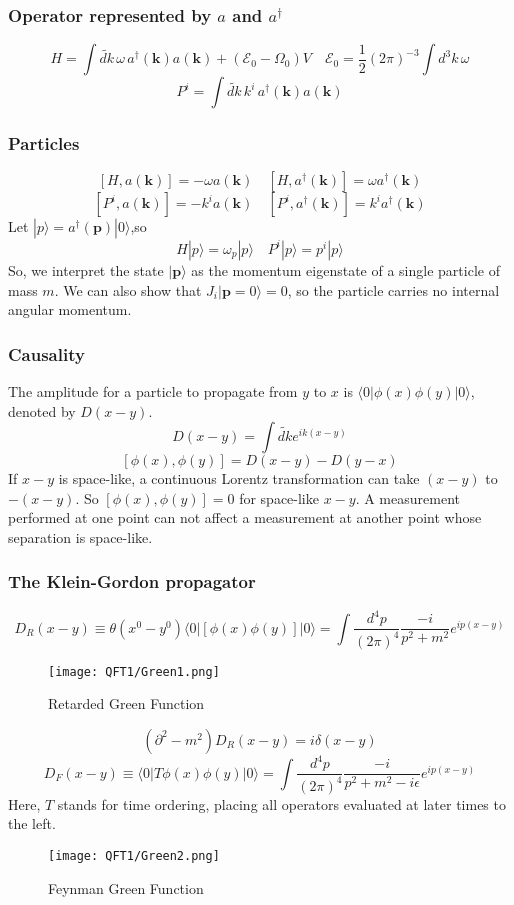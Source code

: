 \subsubsection{Operator represented by $a$ and $a^{\dagger}$}
\[H=\int \widetilde{dk}\, \omega\, a^{\dagger}(\bm{k})a(\bm{k}) + (\mathcal{E}_0 - \Omega_0)V \quad \mathcal{E}_0 = \frac{1}{2}(2\pi)^{-3}\int d^3 k \,\omega\]
\[P^{i}=\int \widetilde{dk}\, k^{i}\, a^{\dagger}(\bm{k})a(\bm{k}) \]
\subsubsection{Particles}
\[[H,a(\bm{k})] = -\omega a(\bm{k}) \quad [H,a^{\dagger}(\bm{k})] = \omega a^{\dagger}(\bm{k})\]
\[[P^i,a(\bm{k})] = -k^i a(\bm{k}) \quad [P^i,a^{\dagger}(\bm{k})] = k^i a^{\dagger}(\bm{k})\]
Let $|p\rangle = a^{\dagger}(\bm{p})|0\rangle $,so
\[H |p\rangle = \omega_p|p\rangle \quad P^i |p\rangle = p^i|p\rangle\]
So, we interpret the state $|\bm{p}\rangle$ as the momentum eigenstate of a single particle of mass $m$. We can also show that 
$J_i|\bm{p} = 0\rangle = 0$, so the particle carries no internal angular momentum.
\subsubsection{Causality}
\noindent
The amplitude for a particle to propagate from $y$ to $x$ is $\langle 0 | \phi(x) \phi(y) | 0 \rangle$, denoted by $D(x-y)$.
\[D(x-y) = \int \widetilde{dk} e^{ik(x-y)}\]
\[[\phi(x),\phi(y)] = D(x-y) -D(y-x)\]
If $x-y$ is space-like, a continuous Lorentz transformation can take $(x-y)$ to $-(x-y)$. So $[\phi(x),\phi(y)] =0$ for space-like $x-y$. A measurement performed at one point can not affect a measurement at another point whose separation is space-like.
\subsubsection{The Klein-Gordon propagator}
\[D_R(x-y) \equiv \theta(x^0-y^0) \langle 0 | [\phi(x) \phi(y)] | 0 \rangle = \int \frac{d^4 p}{(2\pi)^4} \frac{-i}{p^2+m^2} e^{ip(x-y)}\]
\begin{figure}[!h]
\centering
\texttt{[image: QFT1/Green1.png]}
\caption{Retarded Green Function}
\end{figure}
\[(\partial^2-m^2) D_R(x-y) = i \delta(x-y)\]
\[D_F(x-y) \equiv \langle 0 | T\phi(x) \phi(y) | 0 \rangle = \int \frac{d^4 p}{(2\pi)^4} \frac{-i}{p^2+m^2-i\epsilon} e^{ip(x-y)}\]
Here, $T$ stands for time ordering, placing all operators evaluated at later times to the left.
\begin{figure}[!h]
\centering
\texttt{[image: QFT1/Green2.png]}
\caption{Feynman Green Function}
\end{figure}

